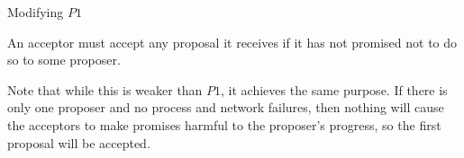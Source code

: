 \documentclass{beamer}
\begin{document}
\begin{frame}{Modifying $P1$}
  \begin{invariant}[$P1^a$]
    An acceptor must accept any proposal it receives if it has not promised not to do so to some proposer.
  \end{invariant}

  Note that while this is weaker than $P1$, it achieves the same purpose. If there is only one proposer and no process and network failures, then nothing will cause the acceptors to make promises harmful to the proposer's progress, so the first proposal will be accepted.
\end{frame}
\end{document}
